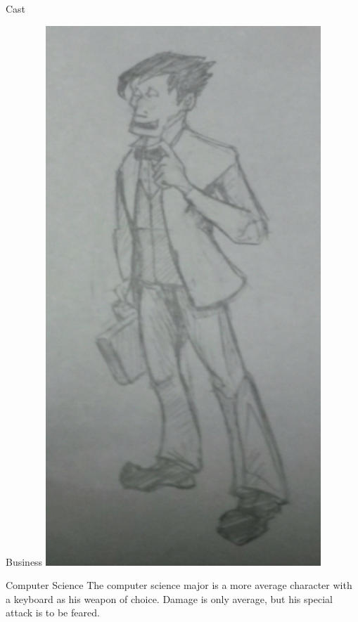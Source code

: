 \documentclass[12pt]{report}
\begin{document}
\begin{section}{Cast}
\begin{subsection}{Business}
\includegraphics[height=8in]{business.png}

\end{subsection}
\clearpage

\begin{subsection}{Computer Science}
The computer science major is a more average character with a keyboard as his
weapon of choice. Damage is only average, but his special attack is to be
feared.


\end{subsection}
\end{section}
\end{document}
